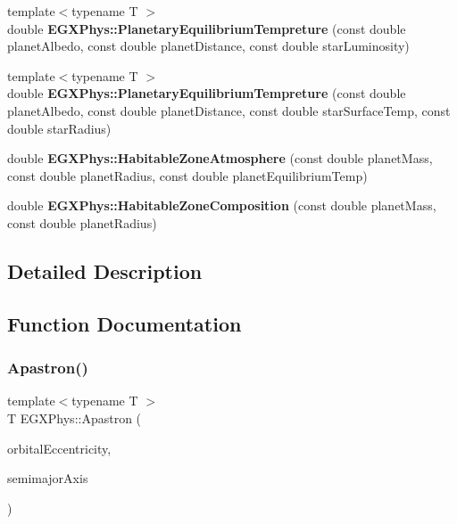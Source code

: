 \begin{DoxyCompactItemize}
{\footnotesize template$<$typename T $>$ }\\double {\bfseries E\+G\+X\+Phys\+::\+Planetary\+Equilibrium\+Tempreture} (const double planet\+Albedo, const double planet\+Distance, const double star\+Luminosity)
\item 
\mbox{\label{group___astrophysics_ga387b915a2eb48bda3fe8bfc369bb564c}} 
{\footnotesize template$<$typename T $>$ }\\double {\bfseries E\+G\+X\+Phys\+::\+Planetary\+Equilibrium\+Tempreture} (const double planet\+Albedo, const double planet\+Distance, const double star\+Surface\+Temp, const double star\+Radius)
\item 
\mbox{\label{group___astrophysics_ga9829bd56a145bd0ef17b38c6f8006f66}} 
double {\bfseries E\+G\+X\+Phys\+::\+Habitable\+Zone\+Atmosphere} (const double planet\+Mass, const double planet\+Radius, const double planet\+Equilibrium\+Temp)
\item 
\mbox{\label{group___astrophysics_ga216592494ebf26b017c36af156c4d14b}} 
double {\bfseries E\+G\+X\+Phys\+::\+Habitable\+Zone\+Composition} (const double planet\+Mass, const double planet\+Radius)
\end{DoxyCompactItemize}


\subsection{Detailed Description}


\subsection{Function Documentation}
\mbox{\label{group___astrophysics_ga2fc1c406ce10f59b4f325150aecd279a}} 
\subsubsection{\texorpdfstring{Apastron()}{Apastron()}}
{\footnotesize\ttfamily template$<$typename T $>$ \\
T E\+G\+X\+Phys\+::\+Apastron (\begin{DoxyParamCaption}\item[{const T \&}]{orbital\+Eccentricity,  }\item[{const T \&}]{semimajor\+Axis }\end{DoxyParamCaption})}



